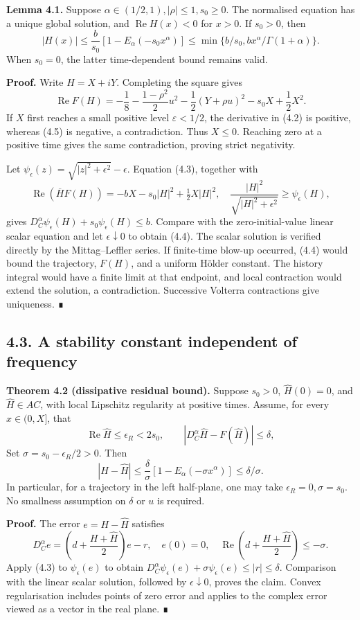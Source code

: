 \documentclass[a4paper,11pt]{article}
\begin{document}
\textbf{Lemma 4.1.} Suppose \(\alpha\in(1/2,1),|\rho|\le1,s_0\ge0\). The normalised equation has a unique global solution, and \(\operatorname{Re}H(x)<0\) for \(x>0\). If \(s_0>0\), then
\[
|H(x)|\le\frac b{s_0}[1-E_\alpha(-s_0x^\alpha)]
\le\min\{b/s_0,bx^\alpha/\Gamma(1+\alpha)\}.
\tag{4.4}
\]
When \(s_0=0\), the latter time-dependent bound remains valid.

\textbf{Proof.} Write \(H=X+iY\). Completing the square gives
\[
\operatorname{Re}F(H)
=-\frac18-\frac{1-\rho^2}{2}u^2
-\frac12(Y+\rho u)^2-s_0X+\frac12X^2.
\tag{4.5}
\]
If \(X\) first reaches a small positive level \(\varepsilon<1/2\), the derivative in (4.2) is positive, whereas (4.5) is negative, a contradiction. Thus \(X\le0\). Reaching zero at a positive time gives the same contradiction, proving strict negativity.

Let \(\psi_\epsilon(z)=\sqrt{|z|^2+\epsilon^2}-\epsilon\). Equation (4.3), together with
\[
\operatorname{Re}(\overline H F(H))
=-bX-s_0|H|^2+\tfrac12X|H|^2,\quad
\frac{|H|^2}{\sqrt{|H|^2+\epsilon^2}}\ge\psi_\epsilon(H),
\]
gives \(D_C^\alpha\psi_\epsilon(H)+s_0\psi_\epsilon(H)\le b\). Compare with the zero-initial-value linear scalar equation and let \(\epsilon\downarrow0\) to obtain (4.4). The scalar solution is verified directly by the Mittag–Leffler series. If finite-time blow-up occurred, (4.4) would bound the trajectory, \(F(H)\), and a uniform Hölder constant. The history integral would have a finite limit at that endpoint, and local contraction would extend the solution, a contradiction. Successive Volterra contractions give uniqueness. ∎

\subsection*{4.3. A stability constant independent of frequency}

\textbf{Theorem 4.2 (dissipative residual bound).} Suppose \(s_0>0\), \(\widehat H(0)=0\), and \(\widehat H\in AC\), with local Lipschitz regularity at positive times. Assume, for every \(x\in(0,X]\), that
\[
\operatorname{Re}\widehat H\le\epsilon_R<2s_0,\qquad
|D_C^\alpha\widehat H-F(\widehat H)|\le\delta,
\]
Set \(\sigma=s_0-\epsilon_R/2>0\). Then
\[
|H-\widehat H|
\le\frac\delta\sigma[1-E_\alpha(-\sigma x^\alpha)]
\le\delta/\sigma.
\tag{4.6}
\]
In particular, for a trajectory in the left half-plane, one may take \(\epsilon_R=0,\sigma=s_0\). No smallness assumption on \(\delta\) or \(u\) is required.

\textbf{Proof.} The error \(e=H-\widehat H\) satisfies
\[
D_C^\alpha e=\left(d+\frac{H+\widehat H}{2}\right)e-r,\quad e(0)=0,\quad
\operatorname{Re}\left(d+\frac{H+\widehat H}{2}\right)\le-\sigma.
\]
Apply (4.3) to \(\psi_\epsilon(e)\) to obtain
\(D_C^\alpha\psi_\epsilon(e)+\sigma\psi_\epsilon(e)\le|r|\le\delta\).
Comparison with the linear scalar solution, followed by \(\epsilon\downarrow0\), proves the claim. Convex regularisation includes points of zero error and applies to the complex error viewed as a vector in the real plane. ∎
\end{document}
